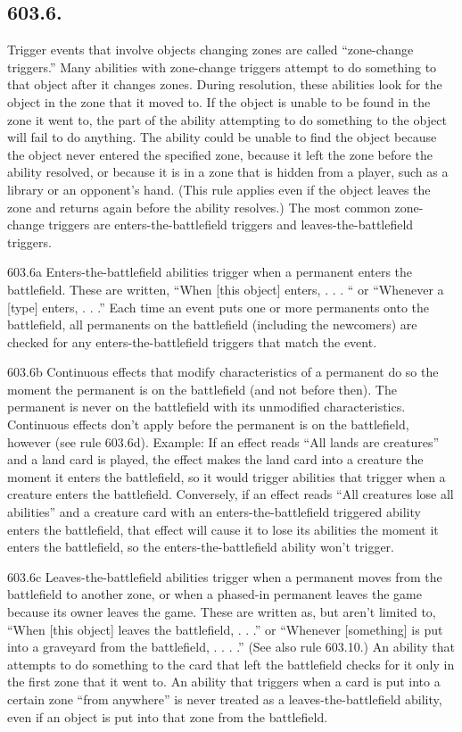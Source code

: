 \subsection*{603.6.}
Trigger events that involve objects changing zones are called “zone-change triggers.” Many abilities with zone-change triggers attempt to do something to that object after it changes zones. During resolution, these abilities look for the object in the zone that it moved to. If the object is unable to be found in the zone it went to, the part of the ability attempting to do something to the object will fail to do anything. The ability could be unable to find the object because the object never entered the specified zone, because it left the zone before the ability resolved, or because it is in a zone that is hidden from a player, such as a library or an opponent’s hand. (This rule applies even if the object leaves the zone and returns again before the ability resolves.) The most common zone-change triggers are enters-the-battlefield triggers and leaves-the-battlefield triggers.

603.6a Enters-the-battlefield abilities trigger when a permanent enters the battlefield. These are written, “When [this object] enters, . . . “ or “Whenever a [type] enters, . . .” Each time an event puts one or more permanents onto the battlefield, all permanents on the battlefield (including the newcomers) are checked for any enters-the-battlefield triggers that match the event.

603.6b Continuous effects that modify characteristics of a permanent do so the moment the permanent is on the battlefield (and not before then). The permanent is never on the battlefield with its unmodified characteristics. Continuous effects don’t apply before the permanent is on the battlefield, however (see rule 603.6d).
Example: If an effect reads “All lands are creatures” and a land card is played, the effect makes the land card into a creature the moment it enters the battlefield, so it would trigger abilities that trigger when a creature enters the battlefield. Conversely, if an effect reads “All creatures lose all abilities” and a creature card with an enters-the-battlefield triggered ability enters the battlefield, that effect will cause it to lose its abilities the moment it enters the battlefield, so the enters-the-battlefield ability won’t trigger.

603.6c Leaves-the-battlefield abilities trigger when a permanent moves from the battlefield to another zone, or when a phased-in permanent leaves the game because its owner leaves the game. These are written as, but aren’t limited to, “When [this object] leaves the battlefield, . . .” or “Whenever [something] is put into a graveyard from the battlefield, . . . .” (See also rule 603.10.) An ability that attempts to do something to the card that left the battlefield checks for it only in the first zone that it went to. An ability that triggers when a card is put into a certain zone “from anywhere” is never treated as a leaves-the-battlefield ability, even if an object is put into that zone from the battlefield.

